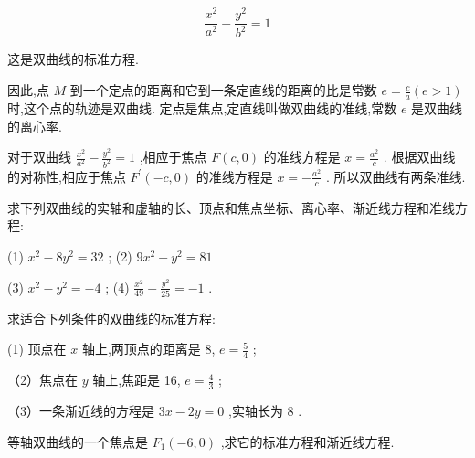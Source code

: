 \documentclass[lang=cn,newtx,10pt,scheme=chinese]{elegantbook}
\begin{document}
\[
  \frac{{x}^{2}}{{a}^{2}} - \frac{{y}^{2}}{{b}^{2}} = 1
\]

这是双曲线的标准方程.

因此,点 \(M\) 到一个定点的距离和它到一条定直线的距离的比是常数 \(e = \frac{c}{a}\left( {e > 1}\right)\) 时,这个点的轨迹是双曲线. 定点是焦点,定直线叫做双曲线的准线,常数 \(e\) 是双曲线的离心率.

对于双曲线 \(\frac{{x}^{2}}{{a}^{2}} - \frac{{y}^{2}}{{b}^{2}} = 1\) ,相应于焦点 \(F\left( {c,0}\right)\) 的准线方程是 \(x = \frac{{a}^{2}}{c}\) . 根据双曲线的对称性,相应于焦点 \({F}^{\prime }\left( {-c,0}\right)\) 的准线方程是 \(x = - \frac{{a}^{2}}{c}\) . 所以双曲线有两条准线.

\begin{problemset}[练习]

\item 求下列双曲线的实轴和虚轴的长、顶点和焦点坐标、离心率、渐近线方程和准线方程:

(1) \({x}^{2} - 8{y}^{2} = {32}\) ; (2) \(9{x}^{2} - {y}^{2} = {81}\)

(3) \({x}^{2} - {y}^{2} = - 4\) ; (4) \(\frac{{x}^{2}}{49} - \frac{{y}^{2}}{25} = - 1\) .

\item 求适合下列条件的双曲线的标准方程:

(1) 顶点在 \(x\) 轴上,两顶点的距离是 8, \(e = \frac{5}{4}\) ;

（2）焦点在 \(y\) 轴上,焦距是 16, \(e = \frac{4}{3}\) ;

（3）一条渐近线的方程是 \({3x} - {2y} = 0\) ,实轴长为 8 .

\item 等轴双曲线的一个焦点是 \({F}_{1}\left( {-6,0}\right)\) ,求它的标准方程和渐近线方程.

\end{problemset}
\end{document}
